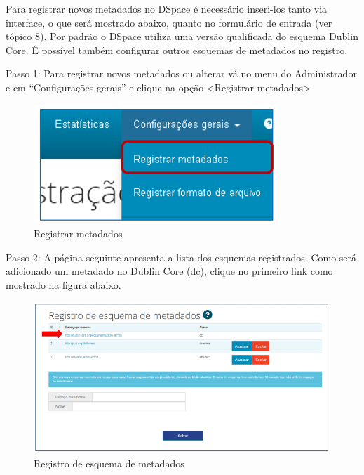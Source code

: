 \documentclass[12pt,hidelinks]{article}
\begin{document}
    Para registrar novos metadados no DSpace é necessário inseri-los tanto via interface, o que será mostrado abaixo, quanto no formulário de entrada (ver tópico 8). Por padrão o DSpace utiliza uma versão qualificada do esquema Dublin Core. É possível também configurar outros esquemas de metadados no registro.
    
    \singlespacing
    
    Passo 1: Para registrar novos metadados ou alterar vá no menu do Administrador e em “Configurações gerais” e clique na opção <Registrar metadados>
    
    \begin{figure}[!htp]
                \centering
                \includegraphics[scale=0.7]{figura/Figura125.png}
                \caption{Registrar metadados}
            \label{Rotulo}
        \end{figure}
    
    Passo 2: A página seguinte apresenta a lista dos esquemas registrados. Como será adicionado um metadado no Dublin Core (dc), clique no primeiro link como mostrado na figura abaixo.
    
    \begin{figure}[!htp]
                \centering
                \includegraphics[scale=0.7]{figura/Figura126.png}
                \caption{Registro de esquema de metadados}
            \label{Rotulo}
        \end{figure}
\end{document}
